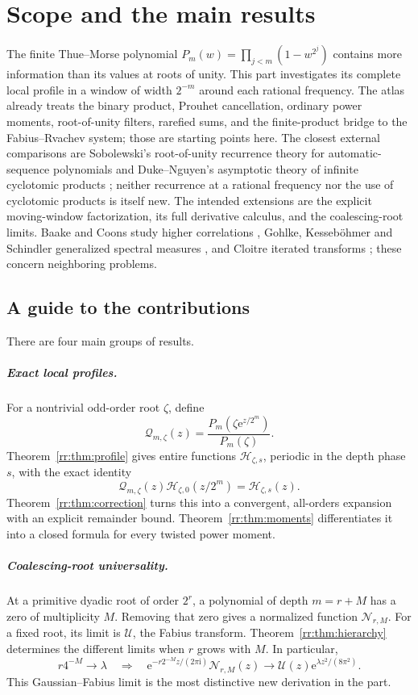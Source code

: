 \documentclass[11pt,a4paper,oneside,openany]{book}
\numberwithin{equation}{chapter}
\theoremstyle{definition}
\theoremstyle{remark}
\newcommand{\e}{\mathrm e}
\newcommand{\ii}{\mathrm i}
\newcommand{\Up}{\mathcal U}
\newcommand{\Hp}{\mathcal H}
\newcommand{\Qp}{\mathcal Q}
\newcommand{\Np}{\mathcal N}
\begin{document}
\chapter{Scope and the main results}
\label{rr:sec:scope}
The finite Thue--Morse polynomial $P_m(w)=\prod_{j<m}(1-w^{2^j})$ contains
more information than its values at roots of unity. This part investigates
its complete local profile in a window of width $2^{-m}$ around each rational
frequency. The atlas already treats the binary product, Prouhet
cancellation, ordinary power moments, root-of-unity filters, rarefied sums,
and the finite-product bridge to the Fabius--Rvachev system; those are
starting points here. The closest external comparisons are Sobolewski's
root-of-unity recurrence theory for automatic-sequence polynomials
\cite{sobolewski} and Duke--Nguyen's asymptotic theory of infinite
cyclotomic products \cite{duke}; neither recurrence at a rational frequency
nor the use of cyclotomic products is itself new. The intended extensions
are the explicit moving-window factorization, its full derivative calculus,
and the coalescing-root limits. Baake and Coons study higher correlations
\cite{baake-coons}, Gohlke, Kesseb\"ohmer and Schindler generalized spectral
measures \cite{gohlke}, and Cloitre iterated transforms \cite{cloitre};
these concern neighboring problems.


\section{A guide to the contributions}
There are four main groups of results.

\paragraph{Exact local profiles.}
For a nontrivial odd-order root \(\zeta\), define
\[
 \Qp_{m,\zeta}(z)=\frac{P_m(\zeta\e^{z/2^m})}{P_m(\zeta)}.
\]
Theorem~\ref{rr:thm:profile} gives entire functions \(\Hp_{\zeta,s}\), periodic in the depth phase \(s\), with the exact identity
\[
 \Qp_{m,\zeta}(z)\Hp_{\zeta,0}(z/2^m)=\Hp_{\zeta,s}(z).
\]
Theorem~\ref{rr:thm:correction} turns this into a convergent, all-orders expansion with an explicit remainder bound. Theorem~\ref{rr:thm:moments} differentiates it into a closed formula for every twisted power moment.

\paragraph{Coalescing-root universality.}
At a primitive dyadic root of order \(2^r\), a polynomial of depth \(m=r+M\) has a zero of multiplicity \(M\). Removing that zero gives a normalized function \(\Np_{r,M}\). For a fixed root, its limit is \(\Up\), the Fabius transform. Theorem~\ref{rr:thm:hierarchy} determines the different limits when \(r\) grows with \(M\). In particular,
\[
 r4^{-M}\longrightarrow\lambda
 \quad\Longrightarrow\quad
 \e^{-r2^{-M}z/(2\pi\ii)}\Np_{r,M}(z)
 \longrightarrow \Up(z)\e^{\lambda z^2/(8\pi^2)}.
\]
This Gaussian--Fabius limit is the most distinctive new derivation in the part.
\end{document}
